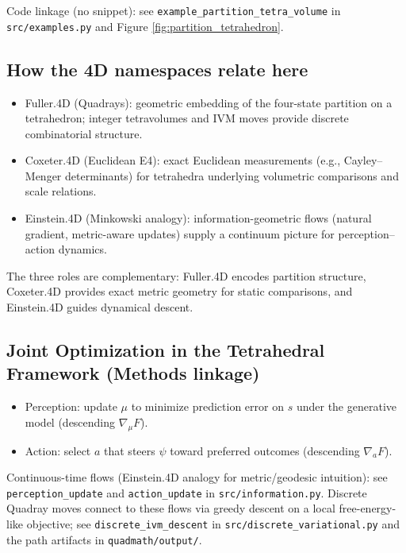 \documentclass[
  10pt,
]{article}
\providecommand{\tightlist}{%
  \setlength{\itemsep}{0pt}\setlength{\parskip}{0pt}}
\begin{document}
Code linkage (no snippet): see
\texttt{example\_partition\_tetra\_volume} in \texttt{src/examples.py}
and Figure \ref{fig:partition_tetrahedron}.

\hypertarget{how-the-4d-namespaces-relate-here}{%
\subsection{How the 4D namespaces relate
here}\label{how-the-4d-namespaces-relate-here}}

\begin{itemize}
\tightlist
\item
  Fuller.4D (Quadrays): geometric embedding of the four-state partition
  on a tetrahedron; integer tetravolumes and IVM moves provide discrete
  combinatorial structure.
\item
  Coxeter.4D (Euclidean E4): exact Euclidean measurements (e.g.,
  Cayley--Menger determinants) for tetrahedra underlying volumetric
  comparisons and scale relations.
\item
  Einstein.4D (Minkowski analogy): information-geometric flows (natural
  gradient, metric-aware updates) supply a continuum picture for
  perception--action dynamics.
\end{itemize}

The three roles are complementary: Fuller.4D encodes partition
structure, Coxeter.4D provides exact metric geometry for static
comparisons, and Einstein.4D guides dynamical descent.

\hypertarget{joint-optimization-in-the-tetrahedral-framework-methods-linkage}{%
\subsection{Joint Optimization in the Tetrahedral Framework (Methods
linkage)}\label{joint-optimization-in-the-tetrahedral-framework-methods-linkage}}

\begin{itemize}
\tightlist
\item
  Perception: update \(\mu\) to minimize prediction error on \(s\) under
  the generative model (descending \(\nabla_{\mu} F\)).
\item
  Action: select \(a\) that steers \(\psi\) toward preferred outcomes
  (descending \(\nabla_{a} F\)).
\end{itemize}

Continuous-time flows (Einstein.4D analogy for metric/geodesic
intuition): see \texttt{perception\_update} and \texttt{action\_update}
in \texttt{src/information.py}. Discrete Quadray moves connect to these
flows via greedy descent on a local free-energy-like objective; see
\texttt{discrete\_ivm\_descent} in \texttt{src/discrete\_variational.py}
and the path artifacts in \texttt{quadmath/output/}.
\end{document}

